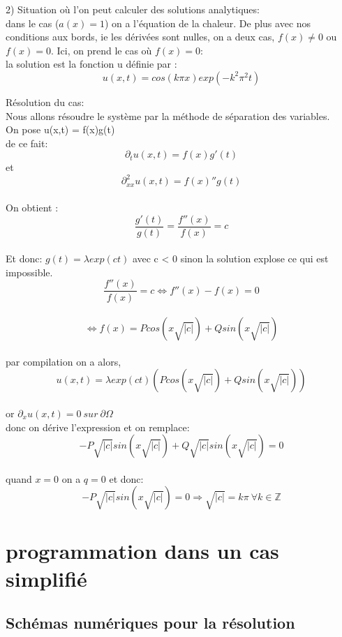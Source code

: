 \documentclass[a4paper,12pt,twoside]{report}
\begin{document}
2) Situation où l'on peut calculer des solutions analytiques: \\
dans le cas ($a(x) = 1$) on a l'équation de la chaleur. De plus avec nos conditions aux bords, ie les dérivées sont nulles, on a deux cas, $ f(x) \neq 0$ ou $f(x) = 0$. Ici, on prend le cas où $f(x) = 0$: \\
 


la solution est la fonction u définie par : \\
$$ u(x,t) =  cos(k \pi x) exp(-k^2 \pi^2 t) $$ 



Résolution du cas: \\
Nous allons résoudre le système par la méthode de séparation des variables.\\
On pose u(x,t) = f(x)g(t)\\
de ce fait: 
$$\partial_t u(x,t) = f(x)g'(t) $$ et $$\partial_{xx}^2 u(x,t) = f(x)''g(t)$$ \\
On obtient : \\
$$ \frac{g'(t)}{g(t)} = \frac{f''(x)}{f(x)} = c $$ \\
Et donc: 
$ g(t) = \lambda exp(ct) $ avec c < 0 sinon la solution explose ce qui est impossible.\\
$$\frac{f''(x)}{f(x)} = c \Leftrightarrow f''(x) - f(x) = 0$$ \\
$$ \Leftrightarrow f(x) = P cos(x \sqrt{|c|}) + Qsin(x \sqrt{|c|})$$ \\
par compilation on a alors, \\
$$ u(x,t) = \lambda exp(ct) (P cos(x \sqrt{|c|}) + Qsin(x \sqrt{|c|})) $$ \\
or $\partial_x u(x,t) = 0 \ sur \  \partial \Omega$ \\
donc on dérive l'expression et on remplace: \\
$$ -P \sqrt{|c|} sin(x \sqrt{|c|}) + Q \sqrt{|c|} sin(x \sqrt{|c|}) = 0$$ \\
quand $x = 0$ on a $q = 0$ et donc:\\
$$-P \sqrt{|c|} sin(x \sqrt{|c|}) = 0 \Rightarrow \sqrt{|c|}= k \pi \ \forall k \in \mathbb{Z} $$







\chapter{programmation dans un cas simplifié} 
\section{Schémas numériques pour la résolution}
\end{document}
